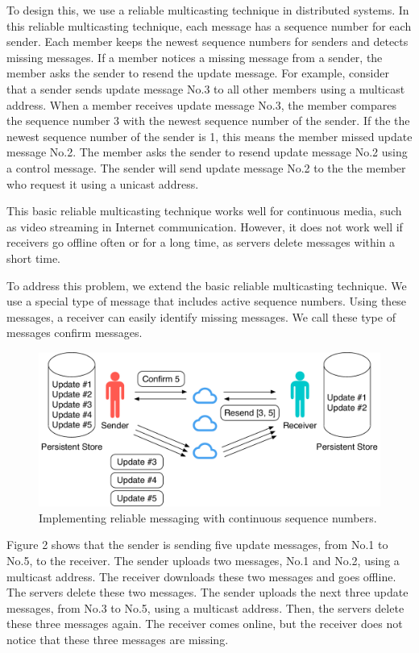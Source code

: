 \documentclass[sigconf]{acmart}
\begin{document}
To design this, we use a reliable multicasting technique in distributed systems\cite{tanenbaum2007distributed}.
In this reliable multicasting technique, each message has a sequence number for each sender.
Each member keeps the newest sequence numbers for senders and detects missing messages.
If a member notices a missing message from a sender, the member asks the sender to resend the update message.
For example, consider that a sender sends update message No.3 to all other members using a multicast address.
When a member receives update message No.3, the member compares the sequence number 3 with the newest sequence number of the sender.
If the the newest sequence number of the sender is 1, this means the member missed update message No.2.
The member asks the sender to resend update message No.2 using a control message.
The sender will send update message No.2 to the the member who request it using a unicast address.

This basic reliable multicasting technique works well for continuous media, such as video streaming in Internet communication.
However, it does not work well if receivers go offline often or for a long time, as servers delete messages within a short time.

To address this problem, we extend the basic reliable multicasting technique.
We use a special type of message that includes active sequence numbers.
Using these messages, a receiver can easily identify missing messages.
We call these type of messages confirm messages.

\begin{figure}[t]
	\centering
	\includegraphics[scale=0.38]{reliable_sync}
	\caption{Implementing reliable messaging with continuous sequence numbers.}
\end{figure}

Figure 2 shows that the sender is sending five update messages, from No.1 to No.5, to the receiver.
The sender uploads two messages, No.1 and No.2, using a multicast address.
The receiver downloads these two messages and goes offline.
The servers delete these two messages.
The sender uploads the next three update messages, from No.3 to No.5, using a multicast address.
Then, the servers delete these three messages again.
The receiver comes online, but the receiver does not notice that these three messages are missing.
\end{document}
